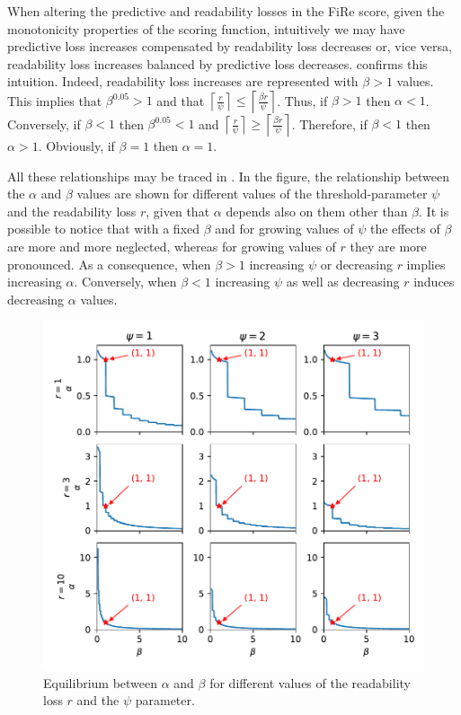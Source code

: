 \documentclass{article}
\newcommand{\fire}{FiRe}
\begin{document}
When altering the predictive and readability losses in the \fire{} score, given the monotonicity properties of the scoring function, intuitively we may have predictive loss increases compensated by readability loss decreases or, vice versa, readability loss increases balanced by predictive loss decreases.
%
 confirms this intuition.
%
Indeed, readability loss increases are represented with $\beta > 1$ values.
%
This implies that $\beta^{0.05} > 1$ and that $\left \lceil{\frac{r}{\psi}}\right \rceil \leq \left \lceil{\frac{\beta r}{\psi}}\right \rceil$.
%
Thus, if $\beta > 1$ then $\alpha < 1$.
%
Conversely, if $\beta < 1$ then $\beta^{0.05} < 1$ and $\left \lceil{\frac{r}{\psi}}\right \rceil \geq \left \lceil{\frac{\beta r}{\psi}}\right \rceil$.
%
Therefore, if $\beta < 1$ then $\alpha > 1$.
%
Obviously, if $\beta = 1$ then $\alpha = 1$.

All these relationships may be traced in .
%
In the figure, the relationship between the $\alpha$ and $\beta$ values are shown for different values of the threshold-parameter $\psi$ and the readability loss $r$, given that $\alpha$ depends also on them other than $\beta$.
%
It is possible to notice that with a fixed $\beta$ and for growing values of $\psi$ the effects of $\beta$ are more and more neglected, whereas for growing values of $r$ they are more pronounced.
%
As a consequence, when $\beta > 1$ increasing $\psi$ or decreasing $r$ implies increasing $\alpha$.
%
Conversely, when $\beta < 1$ increasing $\psi$ as well as decreasing $r$ induces decreasing $\alpha$ values.

\begin{figure}
	\centering
	\includegraphics[width=1.02\linewidth]{figures/equi.pdf}
	\caption{Equilibrium between $\alpha$ and $\beta$ for different values of the readability loss $r$ and the $\psi$ parameter.}\label{fig:equi}
\end{figure}
\end{document}
